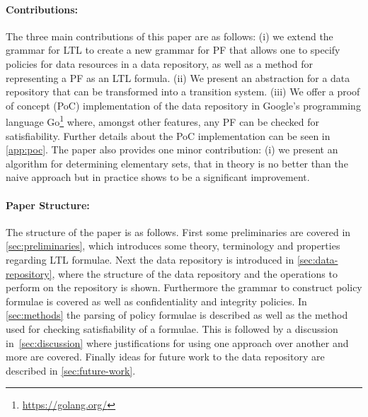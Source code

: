 \paragraph{Contributions:} The three main contributions of this paper are as follows: (i) we extend the grammar for LTL to create a new grammar for PF that allows one to specify policies for data resources in a data repository, as well as a method for representing a PF as an LTL formula. (ii) We present an abstraction for a data repository that can be transformed into a transition system. (iii) We offer a proof of concept (PoC) implementation of the data repository in Google's programming language Go\footnote{\url{https://golang.org/}} where, amongst other features, any PF can be checked for satisfiability. Further details about the PoC implementation can be seen in \autoref{app:poc}. The paper also provides one minor contribution: (i) we present an algorithm for determining elementary sets, that in theory is no better than the naive approach but in practice shows to be a significant improvement.

\paragraph{Paper Structure:}
The structure of the paper is as follows. First some preliminaries are covered in \autoref{sec:preliminaries}, which introduces some theory, terminology and properties regarding LTL formulae. Next the data repository is introduced in \autoref{sec:data-repository}, where the structure of the data repository and the operations to perform on the repository is shown. Furthermore the grammar to construct policy formulae is covered as well as confidentiality and integrity policies. In \autoref{sec:methods} the parsing of policy formulae is described as well as the method used for checking satisfiability of a formulae. This is followed by a discussion in~\autoref{sec:discussion} where justifications for using one approach over another and more are covered. Finally ideas for future work to the data repository are described in \autoref{sec:future-work}.